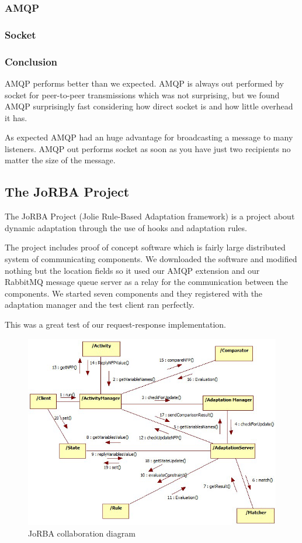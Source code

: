 \subsubsection{AMQP}





\subsubsection{Socket}

\subsubsection{Conclusion}
AMQP performs better than we expected. AMQP is always out performed by socket for peer-to-peer transmissions which was not surprising, but we found AMQP surprisingly fast considering how direct socket is and how little overhead it has.

As expected AMQP had an huge advantage for broadcasting a message to many listeners. AMQP out performs socket as soon as you have just two recipients no matter the size of the message.
\subsection{The JoRBA Project}
\label{subsec:The JoRBA Project}
The JoRBA Project\cite{Jorba} (Jolie Rule-Based Adaptation framework) is a project about dynamic adaptation through the use of hooks and adaptation rules.

The project includes proof of concept software which is fairly large distributed system of communicating components. We downloaded the software and modified nothing but the location fields so it used our AMQP extension and our RabbitMQ message queue server as a relay for the communication between the components. We started seven components and they registered with the adaptation manager and the test client ran perfectly.

This was a great test of our request-response implementation.
\begin{figure}[H]
  \includegraphics[width=\textwidth]{illustrations/Jorba.png}
  \caption{JoRBA collaboration diagram}
\end{figure}
\newpage
